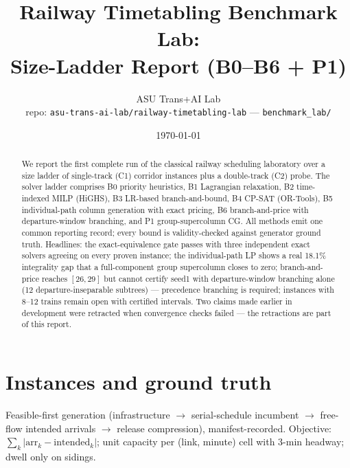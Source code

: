 \documentclass[11pt]{article}
\title{\bf Railway Timetabling Benchmark Lab:\\ Size-Ladder Report (B0--B6 + P1)}
\author{ASU Trans+AI Lab \\ \small repo: \texttt{asu-trans-ai-lab/railway-timetabling-lab} --- \texttt{benchmark\_lab/}}
\date{\today}
\begin{document}
\maketitle

\begin{abstract}
We report the first complete run of the classical railway scheduling laboratory over a size ladder of
single-track (C1) corridor instances plus a double-track (C2) probe. The solver ladder comprises B0
priority heuristics, B1 Lagrangian relaxation, B2 time-indexed MILP (HiGHS), B3 LR-based
branch-and-bound, B4 CP-SAT (OR-Tools), B5 individual-path column generation with exact pricing, B6
branch-and-price with departure-window branching, and P1 group-supercolumn CG. All methods emit one
common reporting record; every bound is validity-checked against generator ground truth. Headlines:
the exact-equivalence gate passes with three independent exact solvers agreeing on every proven
instance; the individual-path LP shows a real 18.1\% integrality gap that a full-component group
supercolumn closes to zero; branch-and-price reaches $[26,29]$ but cannot certify seed1 with departure-window branching alone (12 departure-inseparable subtrees) --- precedence branching is required; instances with
8--12 trains remain open with certified intervals. Two claims made earlier in development were
retracted when convergence checks failed --- the retractions are part of this report.
\end{abstract}

\section{Instances and ground truth}
Feasible-first generation (infrastructure $\to$ serial-schedule incumbent $\to$ free-flow intended
arrivals $\to$ release compression), manifest-recorded. Objective: $\sum_k |\mathrm{arr}_k -
\mathrm{intended}_k|$; unit capacity per (link, minute) cell with 3-min headway; dwell only on sidings.
\end{document}
